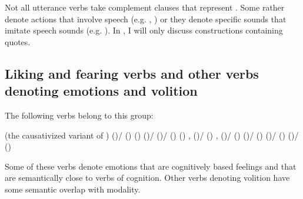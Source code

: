Not all utterance verbs take complement clauses that represent . Some rather denote actions that involve speech (e.g. , ) or they denote specific sounds that imitate speech sounds (e.g.  ). In , I will only discuss constructions containing quotes.



\subsection{Liking and fearing verbs and other verbs denoting emotions and volition}
\label{ssec:Liking and fearing verbs and other verbs denoting emotions and volition}

The following verbs belong to this group: 
%
\begin{exe}
	\ex	\label{ex:verbs of liking of fearing}
	\begin{xlist}
		\ex	{}  
		\ex	{}  (the causativized variant of )
		\ex	{} ()\slash{} () 
		\ex	{} () 
		\ex	{} ()\slash{} 
		\ex	{} ()\slash{} () 
		\ex	{} () ,  
		\ex	{} ()\slash{} () ,  
		\ex	{} ()\slash{} () 
		\ex	{} ()\slash  {} () 
		\ex	{} ()\slash{} () 
		\ex	{} ()\slash{} () 
	\end{xlist}
\end{exe}

Some of these verbs denote emotions that are cognitively based feelings and that are semantically close to verbs of cognition. Other verbs denoting volition have some semantic overlap with modality.


